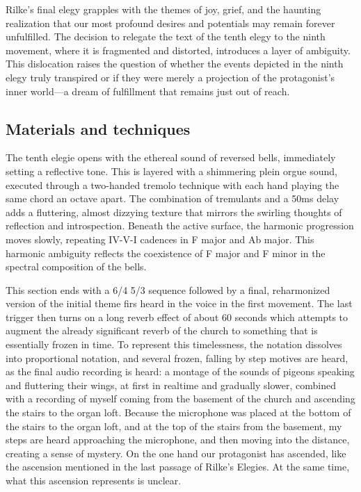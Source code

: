 \documentclass[12pt,twoside,maitrise]{dms_ks}
\theoremstyle{definition}
\begin{document}
{Rilke’s final elegy grapples with the themes of joy, grief, and the haunting realization that our most profound desires and potentials may remain forever unfulfilled. 
The decision to relegate the text of the tenth elegy to the ninth movement, where it is fragmented and distorted, introduces a layer of ambiguity. 
This dislocation raises the question of whether the events depicted in the ninth elegy truly transpired or if they were merely a projection of the protagonist's inner world—a dream of fulfillment that remains just out of reach.

\subsection{Materials and techniques}

The tenth elegie opens with the ethereal sound of reversed bells, immediately setting a reflective tone. 
This is layered with a shimmering plein orgue sound, executed through a two-handed tremolo technique with each hand playing the same chord an octave apart. 
The combination of tremulants and a 50ms delay adds a fluttering, almost dizzying texture that mirrors the swirling thoughts of reflection and introspection. 
Beneath the active surface, the harmonic progression moves slowly, repeating IV-V-I cadences in F major and Ab major. 
This harmonic ambiguity reflects the coexistence of F major and F minor in the spectral composition of the bells.



This section ends with a 6/4 5/3 sequence followed by a final, reharmonized version of the initial theme firs heard in the voice in the first movement. 
The last trigger then turns on a long reverb effect of about 60 seconds which attempts to augment the already significant reverb of the church to something that is essentially frozen in time. 
To represent this timelessness, the notation dissolves into proportional notation, and several frozen, falling by step motives are heard, as the final audio recording is heard: a montage of the sounds of pigeons speaking and fluttering their wings, at first in realtime and gradually slower, combined with a recording of myself coming from the basement of the church and ascending the stairs to the organ loft. 
Because the microphone was placed at the bottom of the stairs to the organ loft, and at the top of the stairs from the basement, my steps are heard approaching the microphone, and then moving into the distance, creating a sense of mystery. 
On the one hand our protagonist has ascended, like the ascension mentioned in the last passage of Rilke's Elegies. 
At the same time, what this ascension represents is unclear.

}
\end{document}
